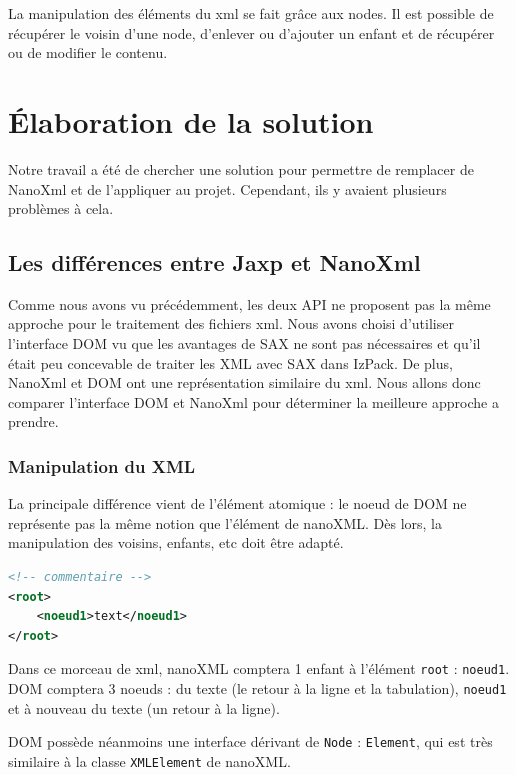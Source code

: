 La manipulation des éléments du xml se fait grâce aux nodes.
Il est possible de récupérer le voisin d'une node, d'enlever ou d'ajouter un enfant et de récupérer ou de modifier le contenu.
\section{Élaboration de la solution}
Notre travail a été de chercher une solution pour permettre de remplacer de NanoXml et de l'appliquer au projet.
Cependant, ils y avaient plusieurs problèmes à cela.
\subsection{Les différences entre Jaxp et NanoXml}
Comme nous avons vu précédemment, les deux API ne proposent pas la même approche pour le traitement des fichiers xml.
Nous avons choisi d'utiliser l'interface DOM vu que les avantages de SAX ne sont pas nécessaires et qu'il était peu concevable de traiter les XML avec SAX dans IzPack.
De plus, NanoXml et DOM ont une représentation similaire du xml.
Nous allons donc comparer l'interface DOM et NanoXml pour déterminer la meilleure approche a prendre.
\subsubsection{Manipulation du XML}
La principale différence vient de l'élément atomique : le noeud de DOM ne représente pas la même notion que l'élément de nanoXML.
Dès lors, la manipulation des voisins, enfants, etc doit être adapté.
\begin{lstlisting}[language=xml]
<!-- commentaire -->
<root>
	<noeud1>text</noeud1>
</root>
\end{lstlisting}
Dans ce morceau de xml, nanoXML comptera 1 enfant à l'élément \verb|root| : \verb|noeud1|.
DOM comptera 3 noeuds : du texte (le retour à la ligne et la tabulation), \verb|noeud1| et à nouveau du texte (un retour à la ligne).

DOM possède néanmoins une interface dérivant de \verb|Node| : \verb|Element|, qui est très similaire à la classe \verb|XMLElement| de nanoXML.
